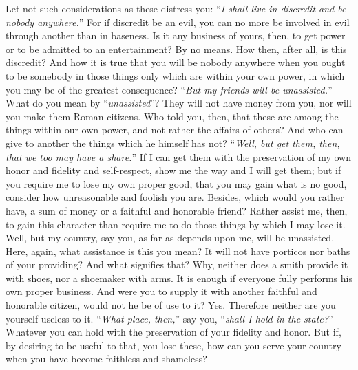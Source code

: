 Let not such considerations as these distress you: ``\emph{I shall live in
discredit and be nobody anywhere.}'' For if discredit be an evil, you can
no more be involved in evil through another than in baseness. Is it any
business of yours, then, to get power or to be admitted to an
entertainment? By no means. How then, after all, is this discredit? And
how it is true that you will be nobody anywhere when you ought to be
somebody in those things only which are within your own power, in which
you may be of the greatest consequence? ``\emph{But my friends will be
unassisted.}'' What do you mean by ``\emph{unassisted}''? They will not have money
from you, nor will you make them Roman citizens. Who told you, then, that
these are among the things within our own power, and not rather the
affairs of others? And who can give to another the things which he
himself has not? ``\emph{Well, but get them, then, that we too may have a
share.}'' If I can get them with the preservation of my own honor and
fidelity and self-respect, show me the way and I will get them; but if
you require me to lose my own proper good, that you may gain what is no
good, consider how unreasonable and foolish you are. Besides, which would
you rather have, a sum of money or a faithful and honorable friend?
Rather assist me, then, to gain this character than require me to do
those things by which I may lose it. Well, but my country, say you, as
far as depends upon me, will be unassisted. Here, again, what assistance
is this you mean? It will not have porticos nor baths of your providing?
And what signifies that? Why, neither does a smith provide it with shoes,
nor a shoemaker with arms. It is enough if everyone fully performs his
own proper business. And were you to supply it with another faithful and
honorable citizen, would not he be of use to it? Yes. Therefore neither
are you yourself useless to it. ``\emph{What place, then,}'' say you, ``\emph{shall I
hold in the state?}'' Whatever you can hold with the preservation of your
fidelity and honor. But if, by desiring to be useful to that, you lose
these, how can you serve your country when you have become faithless and
shameless?
